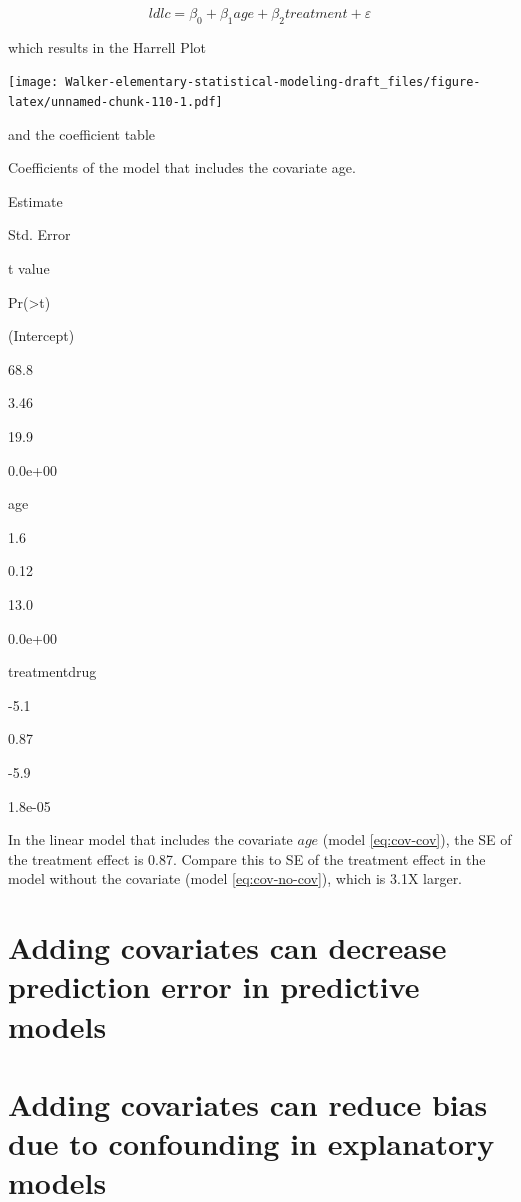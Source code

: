 \documentclass[]{book}
\begin{document}
\begin{equation}
ldlc = \beta_0 + \beta_1 age + \beta_2 treatment + \varepsilon
\label{eq:cov-cov}
\end{equation}

which results in the Harrell Plot

\texttt{[image: Walker-elementary-statistical-modeling-draft\_files/figure-latex/unnamed-chunk-110-1.pdf]}

and the coefficient table

\label{tab:unnamed-chunk-111}Coefficients of the model that includes the covariate age.

Estimate

Std. Error

t value

Pr(\textgreater\textbar t\textbar)

(Intercept)

68.8

3.46

19.9

0.0e+00

age

1.6

0.12

13.0

0.0e+00

treatmentdrug

-5.1

0.87

-5.9

1.8e-05

In the linear model that includes the covariate \(age\) (model \eqref{eq:cov-cov}), the SE of the treatment effect is 0.87. Compare this to SE of the treatment effect in the model without the covariate (model \eqref{eq:cov-no-cov}), which is 3.1X larger.

\hypertarget{adding-covariates-can-decrease-prediction-error-in-predictive-models}{%
\section{Adding covariates can decrease prediction error in predictive models}\label{adding-covariates-can-decrease-prediction-error-in-predictive-models}}

\hypertarget{adding-covariates-can-reduce-bias-due-to-confounding-in-explanatory-models}{%
\section{Adding covariates can reduce bias due to confounding in explanatory models}\label{adding-covariates-can-reduce-bias-due-to-confounding-in-explanatory-models}}
\end{document}
